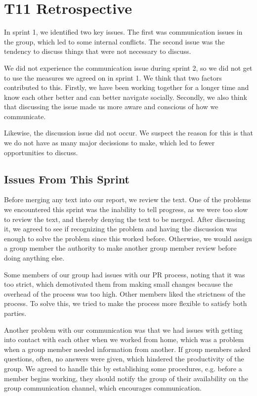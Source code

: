 \section{T11 Retrospective} \label{s2Retrospective}

In sprint 1, we identified two key issues. The first was communication issues in the group, which led to some internal conflicts. The second issue was the tendency to discuss things that were not necessary to discuss.

We did not experience the communication issue during sprint 2, so we did not get to use the measures we agreed on in sprint 1. We think that two factors contributed to this. Firstly, we have been working together for a longer time and know each other better and can better navigate socially. Secondly, we also think that discussing the issue made us more aware and conscious of how we communicate.

Likewise, the discussion issue did not occur. We suspect the reason for this is that we do not have as many major decissions to make, which led to fewer opportunities to discuss.

\subsection{Issues From This Sprint}

Before merging any text into our report, we review the text. One of the problems we encountered this sprint was the inability to tell progress, as we were too slow to review the text, and thereby denying the text to be merged. After discussing it, we agreed to see if recognizing the problem and having the discussion was enough to solve the problem since this worked before. Otherwise, we would assign a group member the authority to make another group member review before doing anything else.

Some members of our group had issues with our \gls{PR} process, noting that it was too strict, which demotivated them from making small changes because the overhead of the process was too high. Other members liked the strictness of the process. To solve this, we tried to make the process more flexible to satisfy both parties.

Another problem with our communication was that we had issues with getting into contact with each other when we worked from home, which was a problem when a group member needed information from another. If group members asked questions, often, no answers were given, which hindered the productivity of the group. We agreed to handle this by establishing some procedures, e.g. before a member begins working, they should notify the group of their availability on the group communication channel, which encourages communication.

